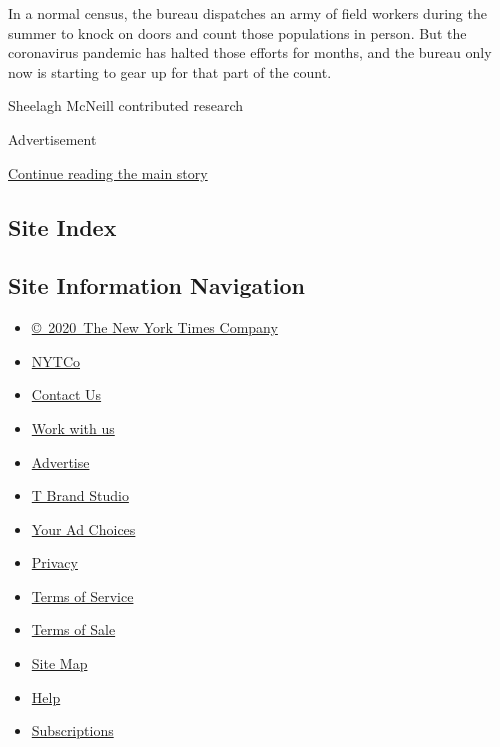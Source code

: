 In a normal census, the bureau dispatches an army of field workers
during the summer to knock on doors and count those populations in
person. But the coronavirus pandemic has halted those efforts for
months, and the bureau only now is starting to gear up for that part of
the count.

Sheelagh McNeill contributed research

Advertisement

\protect\hyperlink{after-bottom}{Continue reading the main story}

\hypertarget{site-index}{%
\subsection{Site Index}\label{site-index}}

\hypertarget{site-information-navigation}{%
\subsection{Site Information
Navigation}\label{site-information-navigation}}

\begin{itemize}
\tightlist
\item
  \href{https://help.nytimes.com/hc/en-us/articles/115014792127-Copyright-notice}{©~2020~The
  New York Times Company}
\end{itemize}

\begin{itemize}
\tightlist
\item
  \href{https://www.nytco.com/}{NYTCo}
\item
  \href{https://help.nytimes.com/hc/en-us/articles/115015385887-Contact-Us}{Contact
  Us}
\item
  \href{https://www.nytco.com/careers/}{Work with us}
\item
  \href{https://nytmediakit.com/}{Advertise}
\item
  \href{http://www.tbrandstudio.com/}{T Brand Studio}
\item
  \href{https://www.nytimes.com/privacy/cookie-policy\#how-do-i-manage-trackers}{Your
  Ad Choices}
\item
  \href{https://www.nytimes.com/privacy}{Privacy}
\item
  \href{https://help.nytimes.com/hc/en-us/articles/115014893428-Terms-of-service}{Terms
  of Service}
\item
  \href{https://help.nytimes.com/hc/en-us/articles/115014893968-Terms-of-sale}{Terms
  of Sale}
\item
  \href{https://spiderbites.nytimes.com}{Site Map}
\item
  \href{https://help.nytimes.com/hc/en-us}{Help}
\item
  \href{https://www.nytimes.com/subscription?campaignId=37WXW}{Subscriptions}
\end{itemize}

